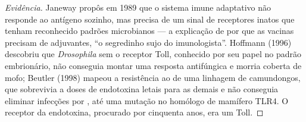 \begin{proof}[Evidência]
Janeway propôs em 1989 que o sistema imune adaptativo não responde ao
antígeno sozinho, mas precisa de um sinal de receptores inatos que
tenham reconhecido padrões microbianos --- a explicação de por que as
vacinas precisam de adjuvantes, ``o segredinho sujo do imunologista''.
Hoffmann (1996) descobriu que \emph{Drosophila} sem o receptor Toll,
conhecido por seu papel no padrão embrionário, não conseguia montar uma
resposta antifúngica e morria coberta de mofo; Beutler (1998) mapeou a
resistência ao  de uma linhagem de camundongos, que
sobrevivia a doses de endotoxina letais para as demais e não conseguia
eliminar infecções por , até uma mutação no homólogo de
mamífero TLR4. O receptor da endotoxina, procurado por cinquenta anos,
era um Toll.
\end{proof}

